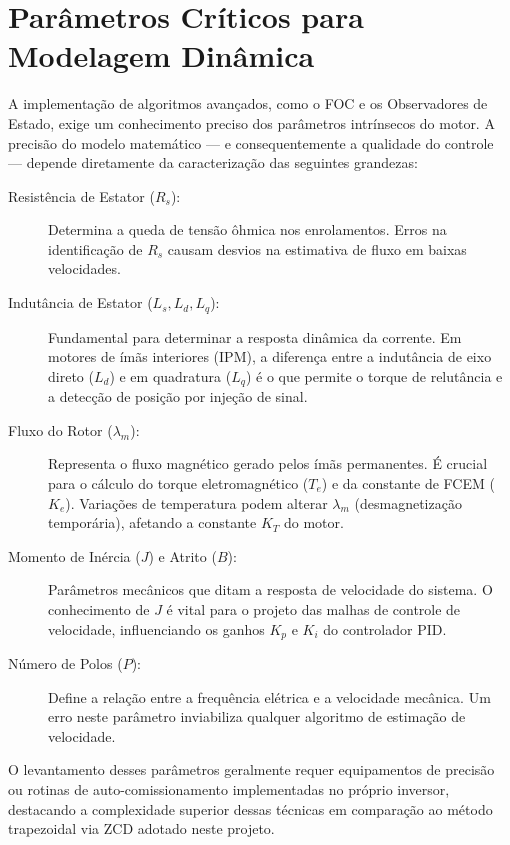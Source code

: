\documentclass[12pt, a4paper, openright, oneside, brazilian]{abntex2}
\begin{document}
\section{Parâmetros Críticos para Modelagem Dinâmica}
\label{sec:parametros_modelagem}

A implementação de algoritmos avançados, como o FOC e os Observadores de Estado, exige um conhecimento preciso dos parâmetros intrínsecos do motor. A precisão do modelo matemático — e consequentemente a qualidade do controle — depende diretamente da caracterização das seguintes grandezas:

\begin{description}
    \item[Resistência de Estator ($R_s$):] Determina a queda de tensão ôhmica nos enrolamentos. Erros na identificação de $R_s$ causam desvios na estimativa de fluxo em baixas velocidades.
    
    \item[Indutância de Estator ($L_s, L_d, L_q$):] Fundamental para determinar a resposta dinâmica da corrente. Em motores de ímãs interiores (IPM), a diferença entre a indutância de eixo direto ($L_d$) e em quadratura ($L_q$) é o que permite o torque de relutância e a detecção de posição por injeção de sinal.
    
    \item[Fluxo do Rotor ($\lambda_m$):] Representa o fluxo magnético gerado pelos ímãs permanentes. É crucial para o cálculo do torque eletromagnético ($T_e$) e da constante de FCEM ($K_e$). Variações de temperatura podem alterar $\lambda_m$ (desmagnetização temporária), afetando a constante $K_T$ do motor.
    
    \item[Momento de Inércia ($J$) e Atrito ($B$):] Parâmetros mecânicos que ditam a resposta de velocidade do sistema. O conhecimento de $J$ é vital para o projeto das malhas de controle de velocidade, influenciando os ganhos $K_p$ e $K_i$ do controlador PID.
    
    \item[Número de Polos ($P$):] Define a relação entre a frequência elétrica e a velocidade mecânica. Um erro neste parâmetro inviabiliza qualquer algoritmo de estimação de velocidade.
\end{description}

O levantamento desses parâmetros geralmente requer equipamentos de precisão ou rotinas de auto-comissionamento implementadas no próprio inversor, destacando a complexidade superior dessas técnicas em comparação ao método trapezoidal via ZCD adotado neste projeto.
\end{document}
